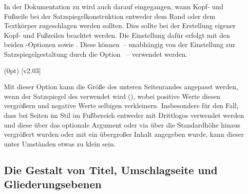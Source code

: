 \begin{DeclareEntity*}{}
\begin{DeclareEntity*}{}
\begin{DeclareEntity*}{}
In der Dokumentation zu  wird auch darauf eingegangen, wann 
Kopf- und Fußzeile bei der Satzspiegelkonstruktion entweder dem Rand oder dem 
Textkörper zugeschlagen werden sollten. Dies sollte bei der Erstellung eigener 
Kopf- und Fußzeilen beachtet werden. Die Einstellung dafür erfolgt mit den 
beiden \KOMAScript-Optionen 
 sowie 
.
Diese können~-- unabhängig von der Einstellung zur Satzspiegelgestaltung durch 
die Option ~-- verwendet werden.

\begin{Declaration}
  {}
  (0pt)
  [v2.03]
\printdeclarationlist

Mit dieser Option kann die Größe des unteren Seitenrandes angepasst werden, 
wenn der Satzspiegel des \CDs verwendet wird (),
wobei positive Werte diesen vergrößern und negative Werte selbigen verkleinern.
Insbesondere für den Fall, dass bei Seiten im Stil  
im Fußbereich entweder mit  Drittlogos verwendet werden und 
diese über das optionale Argument oder via  über die 
Standardhöhe hinaus vergrößert wurden oder mit  ein 
übergroßer Inhalt angegeben wurde, kann dieser unter Umständen etwas zu klein 
sein.
\end{Declaration}
%



\subsection{%
  Die Gestalt von Titel, Umschlagseite und Gliederungsebenen%
}


\end{DeclareEntity*}
\end{DeclareEntity*}
\end{DeclareEntity*}
